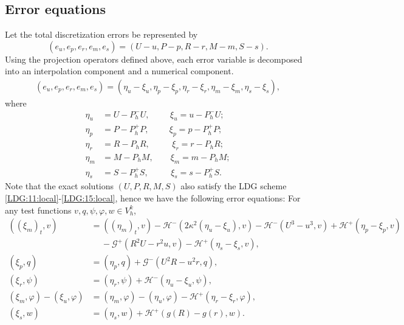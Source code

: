 \documentclass[11pt]{article}
\newcommand{\norm}   [1] {\Vert#1\Vert}
\newcommand{\Hcal} {\mathcal{H}}
\newcommand{\Gcal} {\mathcal{G}}
\numberwithin{equation}{section}
\begin{document}
\subsection{Error equations}
Let the total discretization errors be represented by
\begin{equation*}
	(e_u, e_p, e_r, e_m,e_s)=(U-u, P-p, R-r, M-m,S-s).
\end{equation*}
Using the projection operators defined above, each error variable is decomposed into an
interpolation component and a numerical component.
\begin{align*}
	(e_u, e_p, e_r, e_m,e_s) =(\eta_u-\xi_u, \eta_p-\xi_p, \eta_r-\xi_r, \eta_m-\xi_m,\eta_s-\xi_s),
\end{align*}
where
\begin{align*}
       \eta_u&=U-P_h^-U,~\,\qquad \xi_u=u-P_h^-U;\\
	\eta_p&=P-P_h^+P,~\,\qquad \xi_p=p-P_h^+P;\\
	\eta_r&=R-P_hR,~~\,\qquad \xi_r=r-P_hR;\\
	\eta_m&=M-P_hM,\qquad \xi_m=m-P_hM;\\
	\eta_s&=S-P_h^+S,~~\,\qquad \xi_s=s-P_h^+S.
\end{align*}
Note that the exact solutions $(U, P, R, M,S)$ also satisfy the LDG scheme \eqref{LDG:11:local}-\eqref{LDG:15:local}, hence we have the following error equations: For any test functions $v, q, \psi, \varphi,w \in V_h^k$,
\begin{subequations}\label{erreq}
\begin{align}
((\xi_m)_t, v)&=((\eta_m)_t, v)-\Hcal^-(2\kappa^2(\eta_u-\xi_u), v)-\Hcal^-(U^3-u^3, v)+\Hcal^+(\eta_p-\xi_p, v)\nonumber\\
&~\quad-\!\Gcal^+(R^2U\!-\!r^2u, v)\!-\Hcal^+(\eta_s-\xi_s,v),\label{erreq:1}			\\
(\xi_p, q)&=(\eta_p, q)+\Gcal^-(U^2R-u^2r,q),\label{erreq:2}	\\
(\xi_r,\psi)&=(\eta_r,\psi)+\Hcal^-(\eta_u-\xi_u,\psi),\label{erreq:3}	\\
(\xi_m,\varphi)-(\xi_u, \varphi)&=(\eta_m,\varphi)-(\eta_u,\varphi)-\Hcal^+(\eta_r-\xi_r,\varphi),\label{erreq:4}	\\
(\xi_s, w)&=(\eta_s, w)+\Hcal^+(g(R)-g(r),w). \label{erreq:5}
\end{align}
\end{subequations}
\end{document}
